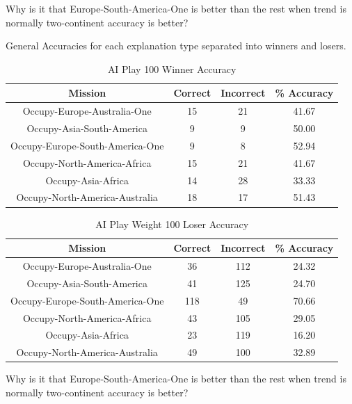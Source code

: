 \documentclass[parskip]{cs4rep}
\begin{document}
Why is it that Europe-South-America-One is better than the rest when trend is normally two-continent accuracy is better?

General Accuracies for each explanation type separated into winners and losers.

\begin{table}[ht]
\centering
\begin{tabular}{|c|c|c|c|}
\hline 
\textbf{Mission} & \textbf{Correct} & \textbf{Incorrect} & \textbf{\% Accuracy} \\ 
\hline 
Occupy-Europe-Australia-One & 15 & 21 & 41.67 \\  
\hline 
Occupy-Asia-South-America & 9 & 9 & 50.00 \\ 
\hline
Occupy-Europe-South-America-One & 9 & 8 & 52.94 \\
\hline
Occupy-North-America-Africa & 15 & 21 & 41.67 \\
\hline
Occupy-Asia-Africa & 14 & 28 & 33.33 \\
\hline
Occupy-North-America-Australia & 18 & 17 & 51.43 \\
\hline
\end{tabular}
\caption{AI Play 100 Winner Accuracy}
\label{table:ai-100-winner-accuracy}
\end{table}
			
\begin{table}[ht]
\centering
\begin{tabular}{|c|c|c|c|}
\hline 
\textbf{Mission} & \textbf{Correct} & \textbf{Incorrect} & \textbf{\% Accuracy} \\ 
\hline 
Occupy-Europe-Australia-One & 36 & 112 & 24.32 \\  
\hline 
Occupy-Asia-South-America & 41 & 125 & 24.70 \\ 
\hline
Occupy-Europe-South-America-One & 118 & 49 & 70.66 \\
\hline
Occupy-North-America-Africa & 43 & 105 & 29.05 \\
\hline
Occupy-Asia-Africa & 23 & 119 & 16.20 \\
\hline
Occupy-North-America-Australia & 49 & 100 & 32.89 \\
\hline
\end{tabular}
\caption{AI Play Weight 100 Loser Accuracy}
\label{table:ai-100-loser-accuracy}
\end{table}			

Why is it that Europe-South-America-One is better than the rest when trend is normally two-continent accuracy is better?
\end{document}
